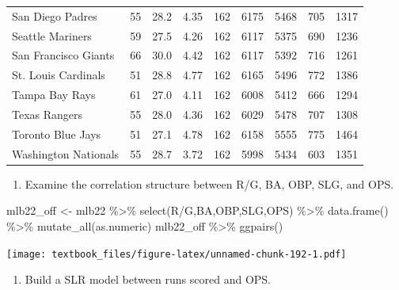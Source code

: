 \documentclass[
  11pt,
]{book}
\newenvironment{Shaded}{\begin{snugshade}}{\end{snugshade}}
\newcommand{\AttributeTok}[1]{\textcolor[rgb]{0.77,0.63,0.00}{#1}}
\newcommand{\FunctionTok}[1]{\textcolor[rgb]{0.00,0.00,0.00}{#1}}
\newcommand{\NormalTok}[1]{#1}
\newcommand{\OtherTok}[1]{\textcolor[rgb]{0.56,0.35,0.01}{#1}}
\newcommand{\SpecialCharTok}[1]{\textcolor[rgb]{0.00,0.00,0.00}{#1}}
\newcommand{\StringTok}[1]{\textcolor[rgb]{0.31,0.60,0.02}{#1}}
\providecommand{\tightlist}{%
  \setlength{\itemsep}{0pt}\setlength{\parskip}{0pt}}
\theoremstyle{definition}
\theoremstyle{definition}
\theoremstyle{definition}
\theoremstyle{definition}
\theoremstyle{remark}
\begin{document}
\begin{tabular}{lllllllll}
San Diego Padres & 55 & 28.2 & 4.35 & 162 & 6175 & 5468 & 705 & 1317\\
Seattle Mariners & 59 & 27.5 & 4.26 & 162 & 6117 & 5375 & 690 & 1236\\
San Francisco Giants & 66 & 30.0 & 4.42 & 162 & 6117 & 5392 & 716 & 1261\\
\addlinespace
St. Louis Cardinals & 51 & 28.8 & 4.77 & 162 & 6165 & 5496 & 772 & 1386\\
Tampa Bay Rays & 61 & 27.0 & 4.11 & 162 & 6008 & 5412 & 666 & 1294\\
Texas Rangers & 55 & 28.0 & 4.36 & 162 & 6029 & 5478 & 707 & 1308\\
Toronto Blue Jays & 51 & 27.1 & 4.78 & 162 & 6158 & 5555 & 775 & 1464\\
Washington Nationals & 55 & 28.7 & 3.72 & 162 & 5998 & 5434 & 603 & 1351\\
\bottomrule
\end{tabular}

\newpage

\begin{enumerate}
\def\labelenumi{(\alph{enumi})}
\setcounter{enumi}{1}
\tightlist
\item
  Examine the correlation structure between R/G, BA, OBP, SLG, and OPS.
\end{enumerate}

\begin{Shaded}
\begin{Highlighting}[]
\NormalTok{mlb22\_off }\OtherTok{\textless{}{-}}\NormalTok{ mlb22 }\SpecialCharTok{\%\textgreater{}\%} \FunctionTok{select}\NormalTok{(}\StringTok{\textasciigrave{}}\AttributeTok{R/G}\StringTok{\textasciigrave{}}\NormalTok{,BA,OBP,SLG,OPS) }\SpecialCharTok{\%\textgreater{}\%} \FunctionTok{data.frame}\NormalTok{() }\SpecialCharTok{\%\textgreater{}\%} \FunctionTok{mutate\_all}\NormalTok{(as.numeric)}
\NormalTok{mlb22\_off }\SpecialCharTok{\%\textgreater{}\%} \FunctionTok{ggpairs}\NormalTok{()}
\end{Highlighting}
\end{Shaded}

\texttt{[image: textbook\_files/figure-latex/unnamed-chunk-192-1.pdf]}

\newpage

\begin{enumerate}
\def\labelenumi{(\alph{enumi})}
\setcounter{enumi}{2}
\tightlist
\item
  Build a SLR model between runs scored and OPS.
\end{enumerate}
\end{document}

